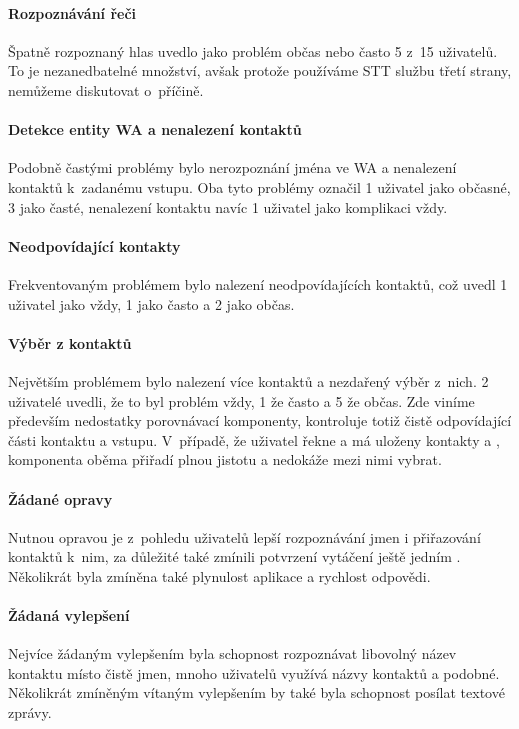 \paragraph{Rozpoznávání řeči} Špatně rozpoznaný hlas uvedlo jako problém občas nebo často 5 z~15 uživatelů.
To je nezanedbatelné množství, avšak protože používáme STT službu
třetí strany, nemůžeme diskutovat o~příčině.

\paragraph{Detekce entity WA a nenalezení kontaktů} Podobně častými problémy bylo nerozpoznání
jména ve WA a nenalezení kontaktů k~zadanému vstupu. Oba
tyto problémy označil 1 uživatel jako občasné, 3 jako časté, nenalezení kontaktu
navíc 1 uživatel jako komplikaci vždy.

\paragraph{Neodpovídající kontakty} Frekventovaným problémem bylo nalezení neodpovídajících kontaktů,
což u\-ve\-dl 1 uživatel jako vždy, 1 jako často a 2 jako občas.

\paragraph{Výběr z kontaktů} Největším problémem bylo nalezení více kontaktů a nezdařený výběr z~nich.
2 uživatelé uvedli, že to byl problém vždy, 1 že často a 5 že
občas. Zde viníme především nedostatky porovnávací komponenty, kontroluje
totiž čistě odpovídající části kontaktu a vstupu. V~případě, že uživatel
řekne  a má uloženy kontakty  a ,
komponenta oběma přiřadí plnou jistotu a nedokáže mezi nimi vybrat.

\paragraph{Žádané opravy} Nutnou opravou je z~pohledu uživatelů lepší rozpoznávání jmen i přiřazování
kontaktů k~nim, za důležité také zmínili potvrzení vytáčení ještě jedním
. Několikrát byla zmíněna také plynulost aplikace a rychlost
odpovědi.

\paragraph{Žádaná vylepšení} Nejvíce žádaným vylepšením byla schopnost rozpoznávat libovolný název kontaktu
místo čistě jmen, mnoho uživatelů využívá názvy kontaktů  a podobné.
Několikrát zmíněným vítaným vylepšením by také byla schopnost posílat textové
zprávy.

